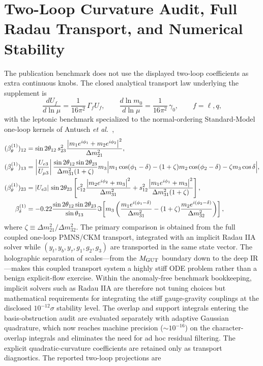 \documentclass[11pt]{article}
\begin{document}
\section{Two-Loop Curvature Audit, Full Radau Transport, and Numerical Stability}

The publication benchmark does not use the displayed two-loop coefficients as extra continuous knobs. The closed analytical transport law underlying the supplement is
\begin{equation}
 \frac{dU_f}{d\ln\mu}=\frac{1}{16\pi^2}\,\Gamma_f U_f,
 \qquad
 \frac{d\ln m_0}{d\ln\mu}=\frac{1}{16\pi^2}\,\gamma_0,
 \qquad f=\ell,q,
\end{equation}
with the leptonic benchmark specialized to the normal-ordering Standard-Model one-loop kernels of Antusch \emph{et al.}~\cite{antusch2005},
\begin{align}
 (\beta_{\theta}^{(1)})_{12}
 &=
 \sin2\theta_{12}\,s_{23}^2
 \frac{\left|m_1e^{i\phi_1}+m_2e^{i\phi_2}\right|^2}{\Delta m_{21}^2}, \\
 (\beta_{\theta}^{(1)})_{13}
 &=
 \left|\frac{U_{e3}}{U_{\mu3}}\right|
 \frac{\sin2\theta_{12}\sin2\theta_{23}}{\Delta m_{31}^2(1+\zeta)}
 m_3\Bigl|
 m_1\cos(\phi_1-\delta)
 -(1+\zeta)m_2\cos(\phi_2-\delta)
 -\zeta m_3\cos\delta
 \Bigr|, \\
 (\beta_{\theta}^{(1)})_{23}
 &=
 |U_{e3}|\,\sin2\theta_{23}
 \left[
 c_{12}^2\frac{\left|m_2e^{i\phi_2}+m_3\right|^2}{\Delta m_{31}^2}
 +s_{12}^2\frac{\left|m_1e^{i\phi_1}+m_3\right|^2}{\Delta m_{31}^2(1+\zeta)}
 \right], \\
 \beta_{\delta}^{(1)}
 &=
 -0.22
 \frac{\sin2\theta_{12}\sin2\theta_{23}}{\sin\theta_{13}}
 \Im\!\left[
 m_3\left(
 \frac{m_1e^{i(\phi_1-\delta)}}{\Delta m_{31}^2}
 -(1+\zeta)\frac{m_2e^{i(\phi_2-\delta)}}{\Delta m_{32}^2}
 \right)
 \right],
\end{align}
where $\zeta\equiv\Delta m_{21}^2/\Delta m_{32}^2$. The primary comparison is obtained from the full coupled one-loop PMNS/CKM transport, integrated with an implicit Radau IIA solver while $(y_t,y_b,y_\tau,g_1,g_2,g_3)$ are transported in the same state vector. The holographic separation of scales---from the $M_{\rm GUT}$ boundary down to the deep IR---makes this coupled transport system a highly stiff ODE problem rather than a benign explicit-flow exercise. Within the anomaly-free benchmark bookkeeping, implicit solvers such as Radau IIA are therefore not tuning choices but mathematical requirements for integrating the stiff gauge-gravity couplings at the disclosed $10^{-12}\sigma$ stability level. The overlap and support integrals entering the basis-obstruction audit are evaluated separately with adaptive Gaussian quadrature, which now reaches machine precision ($\sim10^{-16}$) on the character-overlap integrals and eliminates the need for ad hoc residual filtering. The explicit quadratic-curvature coefficients are retained only as transport diagnostics. The reported two-loop projections are
\end{document}
